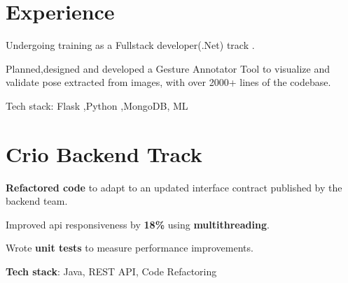 \documentclass[]{deedy-resume-openfont}
\begin{document}
\begin{minipage}[t]{0.66\textwidth} 


\section{Experience}



\vspace{\topsep} %
\begin{tightemize}\item Undergoing training as a Fullstack developer(.Net) track .
\end{tightemize}



\vspace{\topsep} %
\begin{tightemize}\item Planned,designed and developed a Gesture Annotator Tool to visualize and
validate pose extracted from  images, with over 2000+ lines of the codebase.
\item Tech stack: Flask ,Python ,MongoDB, ML
\end{tightemize}


\sectionsep


\section{Crio Backend Track}


\begin{tightemize}
\item \textbf{Refactored code} to adapt to an updated interface contract published by the backend team.
\item Improved api responsiveness by \textbf{18\%} using \textbf{multithreading}.
\item Wrote \textbf{unit tests} to measure performance improvements.
\item \textbf{Tech stack}: Java, REST API, Code Refactoring
\end{tightemize}


\end{minipage}
\end{document}
